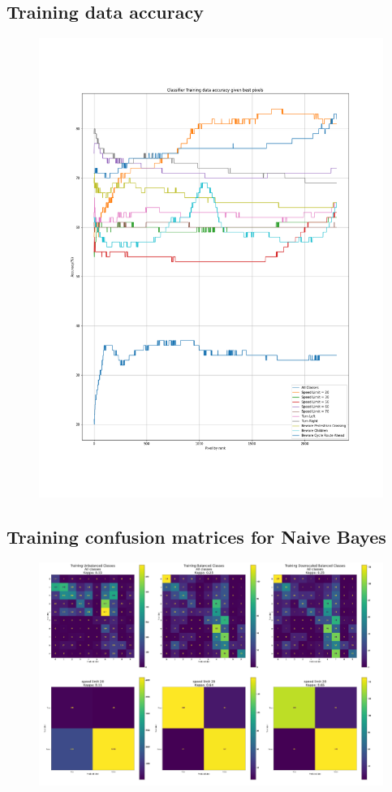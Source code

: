 \documentclass[11pt]{article}
\begin{document}
\begin{appendices}
\newpage
\subsection{Training data accuracy}\label{train_2304}
\begin{figure}[h!]
  \centering
  \includegraphics[scale=0.4]{Images/train_2304_pixels.png}
\end{figure}



\subsection{Training confusion matrices for Naive Bayes}\label{NaiveBayesConfMatTraining}
\begin{figure}[h!]
  \centering
  \includegraphics[scale=0.5]{Images/NaiveBayesConfMatTraining.PNG}
\end{figure}



\end{appendices}
\end{document}
